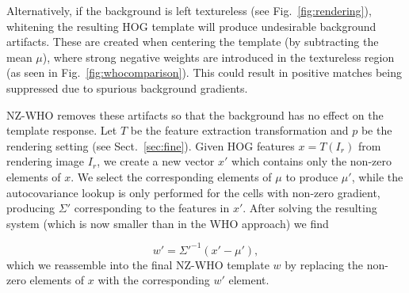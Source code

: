 Alternatively, if the background is left textureless (see
Fig.~\ref{fig:rendering}), whitening the resulting HOG template
will produce undesirable background artifacts. These are created when centering
the template (by subtracting the mean $\mu$), where strong negative weights are
introduced in the textureless region (as seen in Fig.~\ref{fig:whocomparison}).
This could result in positive matches being suppressed due to spurious
background gradients.

NZ-WHO removes these artifacts so that the background has no effect on the
template response. Let $T$ be the feature extraction transformation and $p$ be
the rendering setting (see Sect.~\ref{sec:fine}). Given HOG features $x=T(I_r)$
from rendering image $I_r$, we create a new vector $x'$ which
contains only the non-zero elements of $x$. We select the corresponding elements of
$\mu$ to produce $\mu'$, while the autocovariance lookup is only performed for
the cells with non-zero gradient, producing $\Sigma'$ corresponding to the
features in $x'$. After solving the resulting system (which is now smaller than
in the WHO approach) we find

\begin{equation}
w'=\Sigma'^{-1}(x' - \mu') \label{eq:nz-who},
\end{equation}which we reassemble into the final NZ-WHO template $w$ by
replacing the non-zero elements of $x$ with the corresponding $w'$ element.




